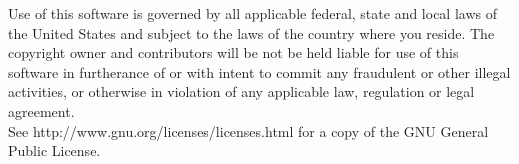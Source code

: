 \documentclass[11pt]{article}
\begin{document}
\begin{appendices}
Use of this software is governed by all applicable federal, state and local
laws of the United States and subject to the laws of the country where you reside.
The copyright owner and contributors will be not be held liable for use of this
software in furtherance of or with intent to commit any fraudulent or other illegal
activities, or otherwise in violation of any applicable law, regulation or legal
agreement.\\

See http://www.gnu.org/licenses/licenses.html for a copy of the GNU General Public 
License.
\end{appendices}



\end{document}
